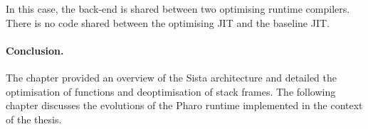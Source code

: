 \documentclass[a4paper,12pt,twoside]{../includes/ThesisStyle}
\begin{document}
In this case, the back-end is shared between two optimising runtime compilers. There is no code shared between the optimising JIT and the baseline JIT. 


\paragraph{Conclusion.}
The chapter provided an overview of the Sista architecture and detailed the optimisation of functions and deoptimisation of stack frames. The following chapter discusses the evolutions of the Pharo runtime implemented in the context of the thesis.

\ifx\wholebook\relax\else
    
\end{document}
